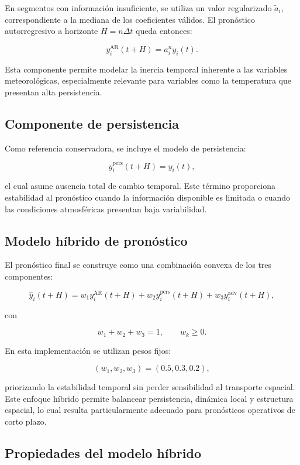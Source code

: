 \documentclass[
  spanish,
  us-letterpaper,
]{scrreprt}
\numberwithin{equation}{section}
\begin{document}
En segmentos con información insuficiente, se utiliza un valor
regularizado \(\tilde{a}_i\), correspondiente a la mediana de los
coeficientes válidos. El pronóstico autorregresivo a horizonte
\(H = n\Delta t\) queda entonces:

\[
y_i^{\text{AR}}(t+H) = a_i^{n} y_i(t). \tag{4.3}
\]

Esta componente permite modelar la inercia temporal inherente a las
variables meteorológicas, especialmente relevante para variables como la
temperatura que presentan alta persistencia.

\subsection{Componente de
persistencia}\label{componente-de-persistencia}

Como referencia conservadora, se incluye el modelo de persistencia:

\[
y_i^{\text{pers}}(t+H) = y_i(t),
\]

el cual asume ausencia total de cambio temporal. Este término
proporciona estabilidad al pronóstico cuando la información disponible
es limitada o cuando las condiciones atmosféricas presentan baja
variabilidad.

\subsection{Modelo híbrido de
pronóstico}\label{modelo-huxedbrido-de-pronuxf3stico}

El pronóstico final se construye como una combinación convexa de los
tres componentes:

\[
\hat{y}_i(t+H) = w_1 y_i^{\text{AR}}(t+H) + w_2 y_i^{\text{pers}}(t+H) + w_3 y_i^{\text{adv}}(t+H),
\]

con

\[
w_1 + w_2 + w_3 = 1, \qquad w_k \ge 0.
\]

En esta implementación se utilizan pesos fijos:

\[
(w_1, w_2, w_3) = (0.5, 0.3, 0.2),
\]

priorizando la estabilidad temporal sin perder sensibilidad al
transporte espacial. Este enfoque híbrido permite balancear
persistencia, dinámica local y estructura espacial, lo cual resulta
particularmente adecuado para pronósticos operativos de corto plazo.

\subsection{Propiedades del modelo
híbrido}\label{propiedades-del-modelo-huxedbrido}
\end{document}

